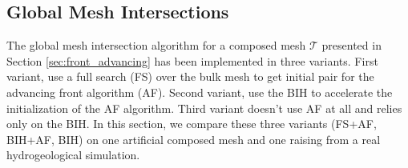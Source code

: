\documentclass{elsarticle}
\newcommand{\fig}[1]{\hyperref[#1]{Figure \ref{#1}}}
\newcommand{\figpath}{figures/}
\newcommand{\noteJB}[1]{{\color{Blue} \textbf{JB: } \textit{#1}}}
\newcommand{\plucker}{Pl\"{u}cker }
\newcommand{\ngh}{NGH }
\begin{document}
% 
% 
% 

\subsection{Global Mesh Intersections}
The global mesh intersection algorithm for a composed mesh $\mathcal T$ presented in Section \ref{sec:front_advancing} has been
implemented in three variants. First variant, use a full search (FS) over the bulk mesh to get initial pair for the advancing front algorithm (AF).
Second variant, use the BIH to accelerate the initialization of the AF algorithm. Third variant doesn't use AF at all and relies only on the BIH. 
In this section, we compare these three variants (FS+AF, BIH+AF, BIH) on one artificial composed mesh and one raising from a real hydrogeological simulation.
\end{document}
